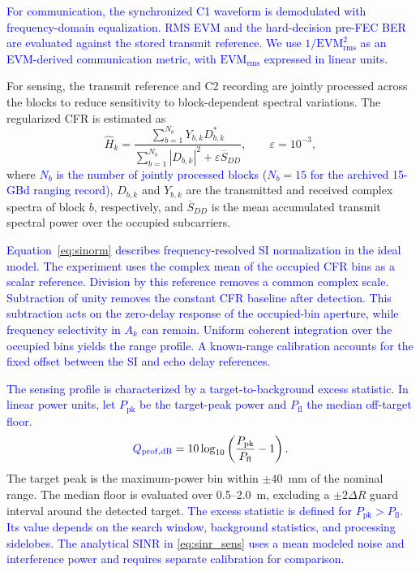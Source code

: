 \documentclass[10pt,journal]{IEEEtran}
\DeclareRobustCommand{\rev}[1]{\textcolor{blue}{#1}}
\begin{document}
\rev{For communication, the synchronized C1 waveform is demodulated
with frequency-domain equalization. RMS EVM and the hard-decision
pre-FEC BER are evaluated against the stored transmit reference.
We use $1/\mathrm{EVM}_{\mathrm{rms}}^2$ as an EVM-derived
communication metric, with $\mathrm{EVM}_{\mathrm{rms}}$ expressed
in linear units.}

For sensing, the transmit reference and C2 recording are jointly
processed across the blocks to reduce sensitivity to block-dependent
spectral variations. The regularized CFR is estimated as
\begin{equation}
\widehat H_k=
\frac{\sum_{b=1}^{N_b}Y_{b,k}D_{b,k}^{*}}
{\sum_{b=1}^{N_b}|D_{b,k}|^2+\varepsilon\overline S_{DD}},
\qquad \varepsilon=10^{-3},
\label{eq:cfr_reg}
\end{equation}
where \rev{$N_b$ is the number of jointly processed
blocks ($N_b=15$ for the archived 15-GBd ranging record),}
$D_{b,k}$ and $Y_{b,k}$ are the transmitted and received complex
spectra of block $b$, respectively, and $\overline S_{DD}$ is the
mean accumulated transmit spectral power over the occupied subcarriers.

\rev{Equation~\eqref{eq:sinorm} describes frequency-resolved SI
normalization in the ideal model. The experiment uses the complex
mean of the occupied CFR bins as a scalar reference. Division by
this reference removes a common complex scale. Subtraction of
unity removes the constant CFR baseline after detection. This
subtraction acts on the zero-delay response of the occupied-bin
aperture, while frequency selectivity in $A_k$ can remain.
Uniform coherent integration over the occupied bins yields the
range profile. A known-range calibration accounts for the fixed
offset between the SI and echo delay references.}

\rev{The sensing profile is characterized by a target-to-background
excess statistic. In linear power units, let $P_{\mathrm{pk}}$
be the target-peak power and $P_{\mathrm{fl}}$ the median
off-target floor.}
\begin{equation}
\rev{Q_{\mathrm{prof,dB}}}
=10\log_{10}
\left(\frac{P_{\mathrm{pk}}}{P_{\mathrm{fl}}}-1\right).
\label{eq:sinr_profile}
\end{equation}
The target peak is the maximum-power bin within $\pm40$~mm of the
nominal range. The median floor is evaluated over 0.5--2.0~m,
excluding a $\pm2\Delta R$ guard interval around the detected target.
\rev{The excess statistic is defined for $P_{\mathrm{pk}}>P_{\mathrm{fl}}$.
Its value depends on the search window, background statistics,
and processing sidelobes. The analytical SINR in
\eqref{eq:sinr_sens} uses a mean modeled noise and interference power
and requires separate calibration for comparison.}
\end{document}
